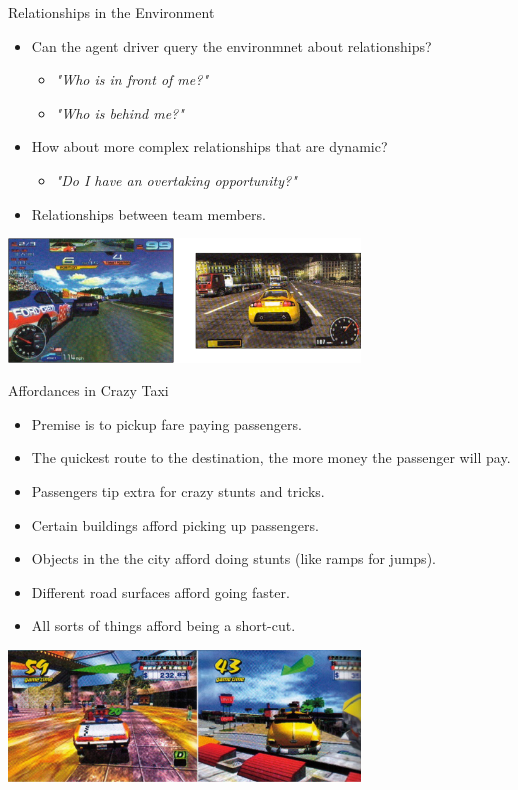 \documentclass[aspectratio=1610,xcolor=dvipsnames,t]{beamer}
\begin{document}
\begin{frame}{Relationships in the Environment}
    \begin{itemize}
        \item Can the agent driver query the environmnet about 
              relationships?
              \begin{itemize}
                \item \emph{"Who is in front of me?"}
                \item \emph{"Who is behind me?"} 
              \end{itemize}
        \item How about more complex relationships that are dynamic?
            \begin{itemize}
                \item \emph{"Do I have an overtaking opportunity?"}
            \end{itemize}
        \item Relationships between team members.
    \end{itemize}
    \begin{center}
        \includegraphics[width=0.7\textwidth]{car-game} 
    \end{center}
\end{frame}

\begin{frame}{Affordances in Crazy Taxi} 
    \begin{itemize}
        \item Premise is to pickup fare paying passengers.
        \item The quickest route to the destination, the more
              money the passenger will pay.
        \item Passengers tip extra for crazy stunts and tricks.
        \item Certain buildings afford picking up passengers.
        \item Objects in the the city afford doing stunts 
              (like ramps for jumps).
        \item Different road surfaces afford going faster.
        \item All sorts of things afford being a short-cut.
    \end{itemize}
    \begin{center}
        \includegraphics[width=0.7\textwidth]{crazytaxi} 
    \end{center}
\end{frame} 
\end{document}
